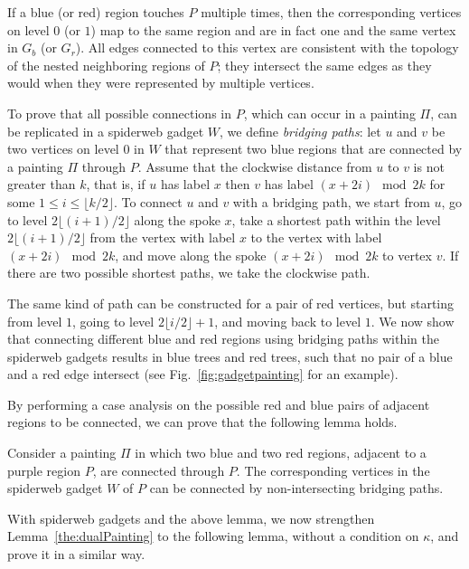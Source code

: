\documentclass[runningheads]{llncs}
\begin{document}
If a blue (or red) region touches $P$ multiple times, then the corresponding vertices on level $0$ (or $1$) map to the same region and are in fact one and the same vertex in $G_b$ (or $G_r$).
All edges connected to this vertex are consistent with the topology of the nested neighboring regions of $P$; they intersect the same edges as they would when they were represented by multiple vertices.

To prove that all possible connections in $P$, which can occur in a painting $\Pi$, can be replicated in a spiderweb gadget $W$, we define \emph{bridging paths}: let $u$ and $v$ be two vertices on level $0$ in $W$ that represent two blue regions that are connected by a painting $\Pi$ through $P$. Assume that the clockwise distance from $u$ to $v$ is not greater than $k$, that is, if $u$ has label $x$ then $v$ has label $(x+2i)\mod 2k$ for some $1 \leq i \leq \lfloor k/2\rfloor$. 
To connect $u$ and $v$ with a bridging path, we start from $u$, go to level $2\lfloor (i+1)/2 \rfloor$ along the spoke $x$, take a shortest path within the level $2\lfloor (i+1)/2 \rfloor$ from the vertex with label $x$ to the vertex with label $(x+2i)\mod 2k$, and move along the spoke $(x+2i)\mod 2k$ to vertex $v$. If there are two possible shortest paths, we take the clockwise path.

The same kind of path can be constructed for a pair of red vertices, but starting from level $1$, going to level $2\lfloor i/2 \rfloor+1$, and moving back to level $1$.
We now show that connecting different blue and red regions using bridging paths within the spiderweb gadgets results in blue trees and red trees, such that no pair of a blue and a red edge intersect (see Fig.~\ref{fig:gadgetpainting} for an example).

By performing a case analysis on the possible red and blue pairs of adjacent regions to be connected, we can prove that the following lemma holds.
\begin{lemma}\label{lem:nonintersecting}
Consider a painting $\Pi$ in which two blue and two red regions, adjacent to a purple region $P$, are connected through $P$. The corresponding vertices in the spiderweb gadget $W$ of $P$ can be connected by non-intersecting bridging paths.
\end{lemma}

With spiderweb gadgets and the above lemma, we now strengthen Lemma~\ref{the:dualPainting} to the following lemma, without a condition on $\kappa$, and prove it in a similar way.
\end{document}
